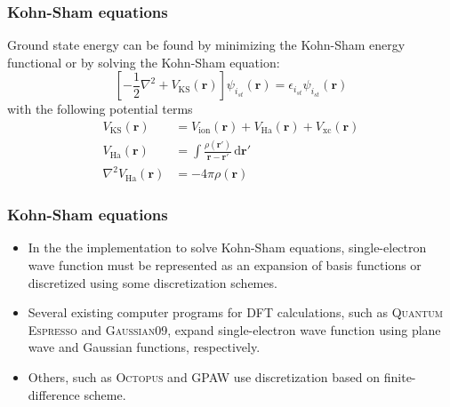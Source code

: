 \documentclass[10pt,t]{beamer}
\begin{document}
\begin{frame}[c]
\frametitle{Kohn-Sham equations}

Ground state energy can be found by minimizing the Kohn-Sham energy functional or
by solving the Kohn-Sham equation:
\begin{equation}
\left[
-\frac{1}{2}\nabla^2  + V_{\mathrm{KS}}(\mathbf{r})
\right] \psi_{i_{st}}(\mathbf{r}) =
\epsilon_{i_{st}}\psi_{i_{st}}(\mathbf{r})
\end{equation}
with the following potential terms
\begin{align*}
V_{\mathrm{KS}}(\mathbf{r}) & = V_{\mathrm{ion}}(\mathbf{r}) + V_{\mathrm{Ha}}(\mathbf{r})
+ V_{\mathrm{xc}}(\mathbf{r}) \\
%
V_{\mathrm{Ha}}(\mathbf{r}) & = \int
\frac{\rho(\mathbf{r}')}
{\mathbf{r} - \mathbf{r}'}\,\mathrm{d}\mathbf{r}' \\
%
\nabla^{2} V_{\mathrm{Ha}}(\mathbf{r}) & = -4\pi \rho(\mathbf{r})
\end{align*}


\end{frame}


\begin{frame}[c]
\frametitle{Kohn-Sham equations}

\begin{itemize}
\item In the the implementation to solve Kohn-Sham equations, single-electron wave function must be
  represented as an expansion of basis functions or discretized using
  some discretization schemes.
\item Several
  existing computer programs for DFT calculations, such as
  \textsc{Quantum Espresso} and \textsc{Gaussian09},
  expand single-electron wave function using plane wave and Gaussian functions, respectively.
\item Others, such as \textsc{Octopus} and GPAW use discretization based on finite-difference scheme.
\end{itemize}

\end{frame}
\end{document}
